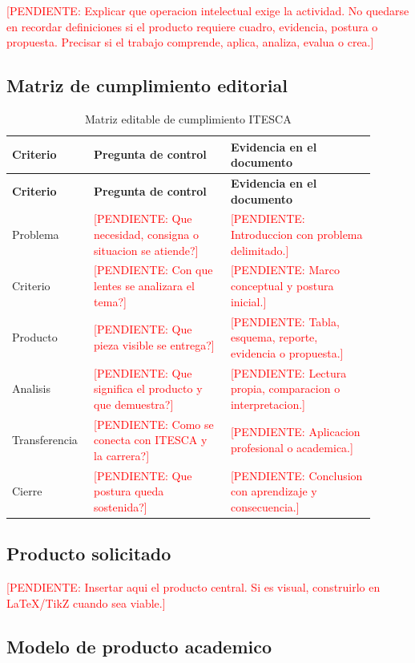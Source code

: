 \documentclass[
	spanish,
	letterpaper, oneside
]{article}
\newcommand{\pendiente}[1]{\textcolor{red}{[PENDIENTE: #1]}}
\begin{document}
\pendiente{Explicar que operacion intelectual exige la actividad. No quedarse en recordar definiciones si el producto requiere cuadro, evidencia, postura o propuesta. Precisar si el trabajo comprende, aplica, analiza, evalua o crea.}

\subsection{Matriz de cumplimiento editorial}

\begin{longtable}{@{}p{0.18\linewidth}p{0.35\linewidth}p{0.37\linewidth}@{}}
	\caption{Matriz editable de cumplimiento ITESCA}\label{tab:matriz-cumplimiento-itesca}\\
	\toprule
	\textbf{Criterio} & \textbf{Pregunta de control} & \textbf{Evidencia en el documento} \\
	\midrule
	\endfirsthead
	\toprule
	\textbf{Criterio} & \textbf{Pregunta de control} & \textbf{Evidencia en el documento} \\
	\midrule
	\endhead
	Problema & \pendiente{Que necesidad, consigna o situacion se atiende?} & \pendiente{Introduccion con problema delimitado.} \\
	Criterio & \pendiente{Con que lentes se analizara el tema?} & \pendiente{Marco conceptual y postura inicial.} \\
	Producto & \pendiente{Que pieza visible se entrega?} & \pendiente{Tabla, esquema, reporte, evidencia o propuesta.} \\
	Analisis & \pendiente{Que significa el producto y que demuestra?} & \pendiente{Lectura propia, comparacion o interpretacion.} \\
	Transferencia & \pendiente{Como se conecta con ITESCA y la carrera?} & \pendiente{Aplicacion profesional o academica.} \\
	Cierre & \pendiente{Que postura queda sostenida?} & \pendiente{Conclusion con aprendizaje y consecuencia.} \\
	\bottomrule
\end{longtable}

\subsection{Producto solicitado}

\pendiente{Insertar aqui el producto central. Si es visual, construirlo en LaTeX/TikZ cuando sea viable.}

\subsection{Modelo de producto academico}
\end{document}
